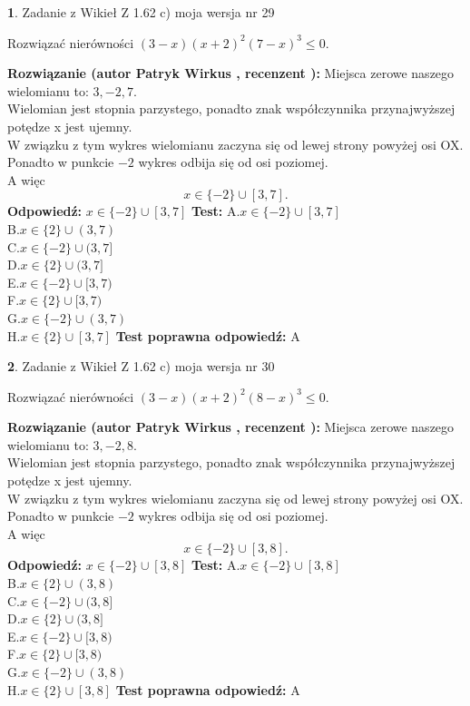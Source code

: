 \documentclass[12pt, a4paper]{article}
\theoremstyle{definition} %
\newtheorem{zad}{}
\newcommand{\zadStart}[1]{\begin{zad}#1\newline}
\newcommand{\zadStop}{\end{zad}}
\newcommand{\rozwStart}[2]{\noindent \textbf{Rozwiązanie (autor #1 , recenzent #2): }\newline}
\newcommand{\rozwStop}{\newline}
\newcommand{\odpStart}{\noindent \textbf{Odpowiedź:}\newline}
\newcommand{\odpStop}{\newline}
\newcommand{\testStart}{\noindent \textbf{Test:}\newline}
\newcommand{\testStop}{\newline}
\newcommand{\kluczStart}{\noindent \textbf{Test poprawna odpowiedź:}\newline}
\newcommand{\kluczStop}{\newline}
\begin{document}
\zadStart{Zadanie z Wikieł Z 1.62 c) moja wersja nr 29}

Rozwiązać nierówności $(3-x)(x+2)^{2}(7-x)^{3}\le0$.
\zadStop
\rozwStart{Patryk Wirkus}{}
Miejsca zerowe naszego wielomianu to: $3, -2, 7$.\\
Wielomian jest stopnia parzystego, ponadto znak współczynnika przy\linebreak najwyższej potędze x jest ujemny.\\ W związku z tym wykres wielomianu zaczyna się od lewej strony powyżej osi OX.\\
Ponadto w punkcie $-2$ wykres odbija się od osi poziomej.\\
A więc $$x \in \{-2\} \cup [3,7].$$
\rozwStop
\odpStart
$x \in \{-2\} \cup [3,7]$
\odpStop
\testStart
A.$x \in \{-2\} \cup [3,7]$\\
B.$x \in \{2\} \cup (3,7)$\\
C.$x \in \{-2\} \cup (3,7]$\\
D.$x \in \{2\} \cup (3,7]$\\
E.$x \in \{-2\} \cup [3,7)$\\
F.$x \in \{2\} \cup [3,7)$\\
G.$x \in \{-2\} \cup (3,7)$\\
H.$x \in \{2\} \cup [3,7]$
\testStop
\kluczStart
A
\kluczStop



\zadStart{Zadanie z Wikieł Z 1.62 c) moja wersja nr 30}

Rozwiązać nierówności $(3-x)(x+2)^{2}(8-x)^{3}\le0$.
\zadStop
\rozwStart{Patryk Wirkus}{}
Miejsca zerowe naszego wielomianu to: $3, -2, 8$.\\
Wielomian jest stopnia parzystego, ponadto znak współczynnika przy\linebreak najwyższej potędze x jest ujemny.\\ W związku z tym wykres wielomianu zaczyna się od lewej strony powyżej osi OX.\\
Ponadto w punkcie $-2$ wykres odbija się od osi poziomej.\\
A więc $$x \in \{-2\} \cup [3,8].$$
\rozwStop
\odpStart
$x \in \{-2\} \cup [3,8]$
\odpStop
\testStart
A.$x \in \{-2\} \cup [3,8]$\\
B.$x \in \{2\} \cup (3,8)$\\
C.$x \in \{-2\} \cup (3,8]$\\
D.$x \in \{2\} \cup (3,8]$\\
E.$x \in \{-2\} \cup [3,8)$\\
F.$x \in \{2\} \cup [3,8)$\\
G.$x \in \{-2\} \cup (3,8)$\\
H.$x \in \{2\} \cup [3,8]$
\testStop
\kluczStart
A
\kluczStop
\end{document}
